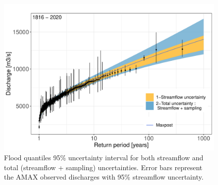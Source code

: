 \documentclass[11pt]{article}
\begin{document}
       \begin{figure}[h!]
            \centering
            \includegraphics[width=0.7\linewidth]{Figs/10-GeV_205years.pdf}
            \caption{Flood quantiles 95\% uncertainty interval for both streamflow and total (streamflow + sampling) uncertainties. Error bars represent the AMAX observed discharges with 95\% streamflow uncertainty.}
            \label{fig:GEV205y}
        \end{figure}            
        
\end{document}
